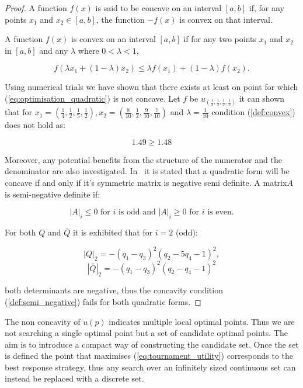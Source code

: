 \documentclass[10pt]{article}
\begin{document}
\begin{proof}
    A function \(f(x)\) is said to be concave on an interval \([a, b]\) if, for any
    points \(x_1\) and \(x_2 \in [a, b]\), the function \(-f(x)\) is convex on that
    interval.

    A function \(f(x)\) is convex on an interval \([a, b]\) if for any two
    points \(x_1\) and \(x_2\) in \([a, b]\) and any \(\lambda\) where \(0 < \lambda < 1\),

    \begin{equation}\label{def:convex}
    f (\lambda x_1 + (1 - \lambda )x_2 ) \leq \lambda f (x_1 ) + (1 - \lambda )f (x_2 ).
    \end{equation}

    Using numerical trials we have shown that there exists at least on point for which
    (\ref{eq:optimisation_quadratic}) is not concave. Let \(f\) be
    \(u_{(\frac{1}{3}, \frac{1}{3}, \frac{1}{3}, \frac{1}{3})}\) it can shown that
    for \(x_1 = (\frac{1}{4}, \frac{1}{2}, \frac{1}{5} , \frac{1}{2}), 
    x_2 = (\frac{8}{10}, \frac{1}{2}, \frac{9}{10} , \frac{7}{10})\) and \(\lambda=\frac{1}{10}\)
    condition (\ref{def:convex}) does not hold as:

    \[1.49 \geq 1.48\]

    Moreover, any potential benefits from the structure of the numerator and the denominator
    are also investigated. In~\cite{Anton2014} it is stated that a quadratic form will
    be concave if and only if it's symmetric matrix is negative semi definite.
    A matrix\(A\) is semi-negative definite if:

    \begin{equation}\label{def:semi_negative}
    |A|_i \leq 0 \text{ for } i \text{ is odd and } |A|_i \geq 0  \text{ for } i
    \text{ is even.}
    \end{equation}

    For both \(Q\) and \(\bar{Q}\) it is exhibited that for \(i=2\) (odd):

    \[|Q|_2 = - \left(q_{1} - q_{3}\right)^{2} \left(q_{2} - 5 q_{4} - 1\right)^{2},\]
    \[|\bar{Q}|_2 =- \left(q_{1} - q_{3}\right)^{2} \left(q_{2} - q_{4} - 1\right)^{2}\]

    both determinants are negative, thus the concavity condition (\ref{def:semi_negative})
    fails for both quadratic forms.
\end{proof}

The non concavity of \(u(p)\) indicates multiple local optimal points. Thus we
are not searching a single optimal point but a set of candidate optimal points.
The aim is to introduce a compact way of constructing the candidate set. Once
the set is defined the point that maximises (\ref{eq:tournament_utility}) corresponds to the best
response strategy, thus any search over an infinitely sized continuous set can instead
be replaced with a discrete set.
\end{document}
